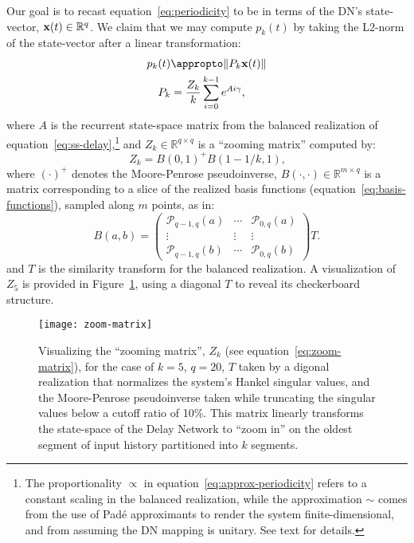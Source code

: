 Our goal is to recast equation~\ref{eq:periodicity} to be in terms of the DN's state-vector, $\mathbf{x}(t) \in \mathbb{R}^q$.
We claim that we may compute $p_k(t)$ by taking the L2-norm of the state-vector after a linear transformation:
\begin{align} \label{eq:approx-periodicity}
p_k(t) &\appropto \| P_k \V{x}(t) \| \\
P_k &= \frac{Z_k}{k} \sum_{i=0}^{k-1} e^{A i \gamma} \text{,} \label{eq:periodicity-matrix}
\end{align}
where $A$ is the recurrent state-space matrix from the balanced realization of equation~\ref{eq:ss-delay},\footnote{%
The proportionality $\propto$ in equation~\ref{eq:approx-periodicity} refers to a constant scaling in the balanced realization, while the approximation $\sim$ comes from the use of Pad\'e approximants to render the system finite-dimensional, and from assuming the DN mapping is unitary.
See text for details.
}
and $Z_k \in \mathbb{R}^{q \times q}$ is a ``zooming matrix'' computed by:
\begin{equation} \label{eq:zoom-matrix}
Z_k = B(0, 1)^+ B(1-1/k, 1) \text{,} %
\end{equation}
where $(\cdot)^+$ denotes the Moore-Penrose pseudoinverse, $B(\cdot, \cdot) \in \mathbb{R}^{m \times q}$ is a matrix corresponding to a slice of the realized basis functions (equation~\ref{eq:basis-functions}), sampled along $m$ points, as in:
\begin{equation}
B(a, b) = \begin{pmatrix}
\mathcal{P}_{q-1,q}(a) & \cdots & \mathcal{P}_{0,q}(a) \\
\vdots & \vdots & \vdots \\
\mathcal{P}_{q-1,q}(b) & \cdots & \mathcal{P}_{0,q}(b)
\end{pmatrix} T \text{.}
\end{equation}
and $T$ is the similarity transform for the balanced realization.
A visualization of $Z_5$ is provided in Figure~\ref{fig:zoom-matrix}, using a diagonal $T$ to reveal its checkerboard structure.

\begin{figure}
  \centering
  \texttt{[image: zoom-matrix]}
  \caption{\label{fig:zoom-matrix}
    Visualizing the ``zooming matrix'', $Z_k$ (see equation~\ref{eq:zoom-matrix}), for the case of $k=5$, $q=20$, $T$ taken by a digonal realization that normalizes the system's Hankel singular values, and the Moore-Penrose pseudoinverse taken while truncating the singular values below a cutoff ratio of 10\%.
   This matrix linearly transforms the state-space of the Delay Network to ``zoom in'' on the oldest segment of input history partitioned into $k$ segments.
  }
\end{figure}

